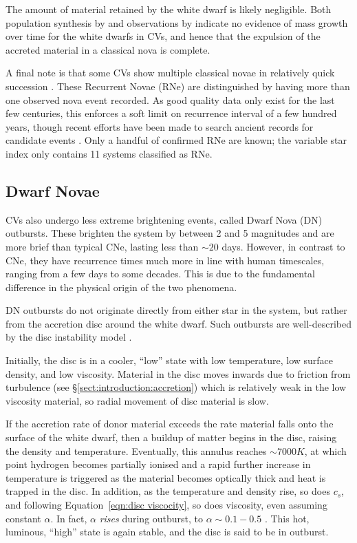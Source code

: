 The amount of material retained by the white dwarf is likely negligible. Both population synthesis by \citep{Wijnen2015} and observations by \citep{McAllister2017} indicate no evidence of mass growth over time for the white dwarfs in CVs, and hence that the expulsion of the accreted material in a classical nova is complete.

A final note is that some CVs show multiple classical novae in relatively quick succession \citep{schaeffer2010}. These Recurrent Novae (RNe) are distinguished by having more than one observed nova event recorded. As good quality data only exist for the last few centuries, this enforces a soft limit on recurrence interval of a few hundred years, though recent efforts have been made to search ancient records for candidate events \citep{hoffmann2022}. Only a handful of confirmed RNe are known; the variable star index \citep{Watson2006} only contains 11 systems classified as RNe.

\subsection{Dwarf Novae}
\label{sect:introduction:dwarf novae}

CVs also undergo less extreme brightening events, called Dwarf Nova (DN) outbursts. These brighten the system by between 2 and 5 magnitudes \citep{warner1995} and are more brief than typical CNe, lasting less than $\sim 20$ days. However, in contrast to CNe, they have recurrence times much more in line with human timescales, ranging from a few days to some decades. This is due to the fundamental difference in the physical origin of the two phenomena.

DN outbursts do not originate directly from either star in the system, but rather from the accretion disc around the white dwarf. Such outbursts are well-described by the disc instability model \citep{cannizzo1993, dubus2018}.

Initially, the disc is in a cooler, ``low'' state with low temperature, low surface density, and low viscosity. Material in the disc moves inwards due to friction from turbulence (see \S\ref{sect:introduction:accretion}) which is relatively weak in the low viscosity material, so radial movement of disc material is slow.

If the accretion rate of donor material exceeds the rate material falls onto the surface of the white dwarf, then a buildup of matter begins in the disc, raising the density and temperature. Eventually, this annulus reaches $\sim 7000K$, at which point hydrogen becomes partially ionised and a rapid further increase in temperature is triggered as the material becomes optically thick and heat is trapped in the disc. In addition, as the temperature and density rise, so does $c_s$, and following Equation~\ref{eqn:disc viscocity}, so does viscosity, even assuming constant $\alpha$. In fact, $\alpha$ {\it rises} during outburst, to $\alpha \sim 0.1 - 0.5$ \citep{hellier2001}. This hot, luminous, ``high'' state is again stable, and the disc is said to be in outburst. 

